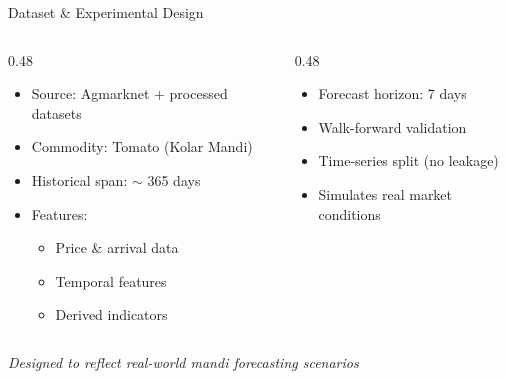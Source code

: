 \documentclass{beamer}
\begin{document}
\begin{frame}{Dataset \& Experimental Design}

\vspace{0.3cm}

\begin{columns}[T]

\begin{column}{0.48\textwidth}

\begin{tcolorbox}[
colback=accentblue!5,
colframe=accentblue!70,
title=\faIcon{database}~Dataset,
arc=5pt]
\small
\begin{itemize}
\item Source: Agmarknet + processed datasets
\item Commodity: Tomato (Kolar Mandi)
\item Historical span: $\sim$ 365 days
\item Features:
\begin{itemize}
\item Price \& arrival data
\item Temporal features
\item Derived indicators
\end{itemize}
\end{itemize}
\end{tcolorbox}

\end{column}

\begin{column}{0.48\textwidth}

\begin{tcolorbox}[
colback=accentgreen!5,
colframe=accentgreen!70,
title=\faIcon{chart-line}~Experimental Setup,
arc=5pt]
\small
\begin{itemize}
\item Forecast horizon: 7 days
\item Walk-forward validation
\item Time-series split (no leakage)
\item Simulates real market conditions
\end{itemize}
\end{tcolorbox}

\end{column}

\end{columns}

\vspace{0.4cm}

\begin{center}
\small
\textit{Designed to reflect real-world mandi forecasting scenarios}
\end{center}

\end{frame}
\end{document}

